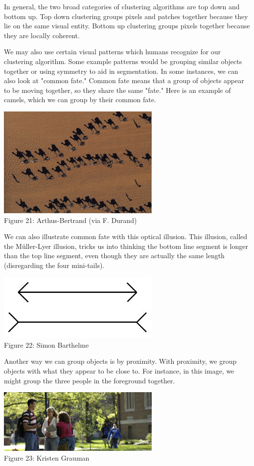 \documentclass{article}
\begin{document}
In general, the two broad categories of clustering algorithms are top down and bottom up. Top down clustering groups pixels and patches together because they lie on the same visual entity. Bottom up clustering groups pixels together because they are locally coherent.

We may also use certain visual patterns which humans recognize for our clustering algorithm. Some example patterns would be grouping similar objects together or using symmetry to aid in segmentation. In some instances, we can also look at "common fate." Common fate means that a group of objects appear to be moving together, so they share the same "fate." Here is an example of camels, which we can group by their common fate. 

\begin{center}
\includegraphics[width=8cm]{camels.png} \\
Figure 21: Arthus-Bertrand (via F. Durand)
\end{center}

We can also illustrate common fate with this optical illusion. This illusion, called the Müller-Lyer illusion, tricks us into thinking the bottom line segment is longer than the top line segment, even though they are actually the same length (disregarding the four mini-tails). 

\begin{center}
\includegraphics[width=8cm]{muller.jpg} \\
Figure 22: Simon Barthelme
\end{center}

Another way we can group objects is by proximity. With proximity, we group objects with what they appear to be close to. For instance, in this image, we might group the three people in the foreground together.
\begin{center}
\includegraphics[width=8cm]{people.png} \\
Figure 23: Kristen Grauman
\end{center}


\small


\end{document}
